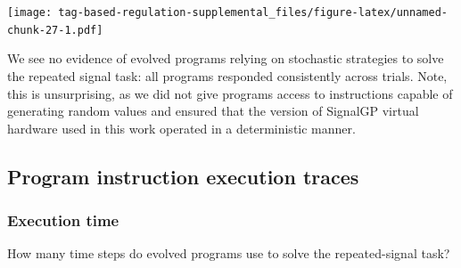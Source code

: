 \documentclass[
]{book}
\begin{document}
\texttt{[image: tag-based-regulation-supplemental\_files/figure-latex/unnamed-chunk-27-1.pdf]}

We see no evidence of evolved programs relying on stochastic strategies to solve the repeated signal task: all programs responded consistently across trials.
Note, this is unsurprising, as we did not give programs access to instructions capable of generating random values and ensured that the version of SignalGP virtual hardware used in this work operated in a deterministic manner.

\hypertarget{program-instruction-execution-traces}{%
\subsection{Program instruction execution traces}\label{program-instruction-execution-traces}}

\hypertarget{execution-time}{%
\subsubsection{Execution time}\label{execution-time}}

How many time steps do evolved programs use to solve the repeated-signal task?
\end{document}
